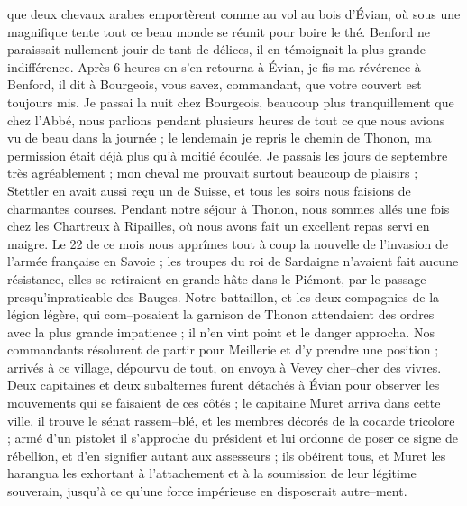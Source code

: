 \documentclass[12pt]{article}
\begin{document}
 que deux chevaux arabes emportèrent comme au vol au bois
d’Évian, où sous une magnifique tente tout ce beau monde se réunit pour boire le thé. Benford ne
paraissait nullement jouir de tant de délices, il en témoignait la plus grande indifférence. Après 6
heures on s’en retourna à Évian, je fis ma révérence à Benford, il dit à Bourgeois, vous savez,
commandant, que votre couvert est toujours mis. Je passai la nuit chez Bourgeois, beaucoup plus
tranquillement que chez l’Abbé, nous parlions pendant plusieurs heures de tout ce que nous avions vu
de beau dans la journée ; le lendemain je repris le chemin de Thonon, ma permission était déjà plus
qu’à moitié écoulée. Je passais les jours de septembre très agréablement ; mon cheval me prouvait
surtout beaucoup de plaisirs ; Stettler en avait aussi reçu un de Suisse, et tous les soirs nous
faisions de charmantes courses. Pendant notre séjour à Thonon, nous sommes allés une fois chez les
Chartreux à Ripailles, où nous avons fait un excellent repas servi en maigre. Le 22 de ce mois nous
apprîmes tout à coup la nouvelle de l’invasion de l’armée française en Savoie ; les troupes du roi
de Sardaigne n’avaient fait aucune résistance, elles se retiraient en grande hâte dans le Piémont,
par le passage presqu’inpraticable des Bauges. Notre battaillon, et les deux compagnies de la légion
légère, qui com–posaient la garnison de Thonon attendaient des ordres avec la plus grande impatience
; il n’en vint point et le danger approcha. Nos commandants résolurent de partir pour Meillerie et
d’y prendre une position ; arrivés à ce village, dépourvu de tout, on envoya à Vevey cher–cher des
vivres. Deux capitaines et deux subalternes furent détachés à Évian pour observer les mouvements qui
se faisaient de ces côtés ; le capitaine Muret arriva dans cette ville, il trouve le sénat
rassem–blé, et les membres décorés de la cocarde tricolore ; armé d’un pistolet il s’approche du
président et lui ordonne de poser ce signe de rébellion, et d’en signifier autant aux assesseurs ;
ils obéirent tous, et Muret les harangua les exhortant à l’attachement et à la soumission de leur
légitime souverain, jusqu’à ce qu’une force impérieuse en disposerait autre–ment.
\end{document}
